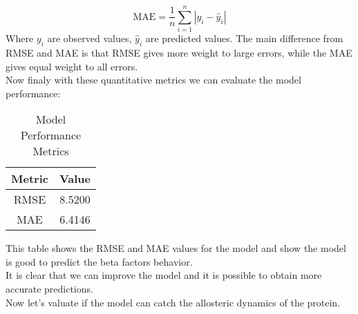 \documentclass[English, Lau, oneside]{sapthesis}
\begin{document}
\[
\text{MAE} = \frac{1}{n} \sum_{i=1}^n |y_i - \hat{y}_i|
\]
Where \(y_i\) are observed values, \(\hat{y}_i\) are predicted values.
The main difference from RMSE and MAE is that RMSE gives more weight to large errors, while the MAE gives equal weight to all errors.\\
Now finaly with these quantitative metrics we can evaluate the model performance:\\
\begin{table}[h!]
    \centering
    \begin{tabular}{|c|c|}
    \hline
    \textbf{Metric} & \textbf{Value} \\ \hline
    RMSE & 8.5200 \\ \hline
    MAE  & 6.4146 \\ \hline
    \end{tabular}
    \caption{Model Performance Metrics}
    \label{tab:model_metrics}
\end{table}
This table shows the RMSE and MAE values for the model and show the model is good to predict the beta factors behavior.\\
It is clear that we can improve the model and it is possible to obtain more accurate predictions.\\
Now let's valuate if the model can catch the allosteric dynamics of the protein.\\
\newpage
\end{document}

